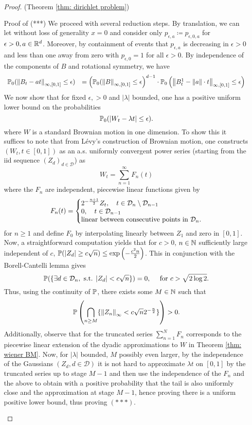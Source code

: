 \documentclass{article}
\begin{document}
\begin{proof}{(Theorem \ref{thm: dirichlet problem})}
\begin{examplesblock}{Proof of (***)}
We proceed with several reduction steps. By translation, we can let without loss of generality $ x=0$ and consider only $ p_{\epsilon,a}\coloneqq p_{\epsilon, 0, a}$ for $ \epsilon>0, a\in \mathbb{R}^{d}$. Moreover, by containment of events that $ p_{\epsilon, a}$ is decreasing in $ \epsilon>0$ and less than one away from zero with $ p_{\epsilon, 0} = 1$ for all $ \epsilon>0$. By independence of the components of $ B$ and rotational symmetry, we have 
\[
\begin{array}{ll}
	\mathbb{P}_{0}(\left\lVert B_{t}-at\right\rVert_{\infty, [0,1]}\leq \epsilon) &= \left(\mathbb{P}_{0}(\left\lVert B\right\rVert_{\infty, [0,1]}\leq \epsilon\right)^{d-1}\cdot \mathbb{P}_{0}\left(\left\lVert B^{1}_{t}-\left\lVert a\right\rVert\cdot t\right\rVert_{\infty, [0,1]}\leq \epsilon\right)\\			      
\end{array}
\]
We now show that for fixed $ \epsilon,  >0$ and $|\lambda|$ bounded, one has a positive uniform lower bound on the probabilities 
\[
\mathbb{P}_{0}(|W_{t}-\lambda t|\leq \epsilon). 
\]
where $ W$ is a standard Brownian motion in one dimension. To show this it suffices to note that from L\'{e}vy's construction of Brownian motion, one constructs $ (W_{t}, t\in [0,1])$ as an a.s. uniformly convergent power series (starting from the iid sequence $ (Z_{d})_{d\in \mathcal{D}}$) as 
\[
W_{t} =\displaystyle\sum^{\infty}_{n=1}F_{n}(t) 
\]
where the $ F_{n}$ are independent, piecewise linear functions given by 
\[
F_{n}(t) = \left\lbrace
\begin{array}{@{}l@{}}
	2^{-\frac{n+1}{2}}Z_{t}, \quad t\in \mathcal{D}_{n}\setminus \mathcal{D}_{n-1} \\
    0, \quad t\in \mathcal{D}_{n-1}\\ 
    \text{linear between consecutive points in } \mathcal{D}_{n}.
\end{array}\right.
\]
for $ n\geq 1$ and define $ F_{0}$ by interpolating linearly between $ Z_{1} $ and zero in $ [0,1]$. Now, a straightforward computation yields that for $c>0 $, $ n\in \mathbb{N}$ sufficiently large independent of $ c$, $\mathbb{P}(|Z_{d}|\geq c\sqrt{n})\leq \exp \left( -\frac{c^{2}n}{2} \right) $. This in conjunction with the Borell-Cantelli lemma gives 
\[
	\mathbb{P}(\{\exists d\in \mathcal{D}_{n}, \text{ s.t. } |Z_{d}|<c\sqrt{n}\}) = 0, \quad \text{ for }c>\sqrt{2\log 2}.
\]
Thus, using the continuity of $ \mathbb{P}$, there exists some $ M\in \mathbb{N}$ such that 
\[
	\mathbb{P} \left( \displaystyle\bigcap_{n\geq M} \{\left\lVert Z_{n}\right\rVert_{\infty}< c\sqrt{n}2^{-\frac{n}{2}}\} \right) > 0.
\]
Additionally, observe that for the truncated series $ \sum_{n=1}^{N} F_{n}$ corresponds to the piecewise linear extension of the dyadic approximations to $ W$ in Theorem \ref{thm: wiener BM}. Now, for $ |\lambda|$ bounded, $ M$ possibly even larger,  by the independence of the Gaussians $ (Z_{d}, d\in \mathcal{D})$ it is not hard to approximate $ \lambda t$ on $ [0,1]$ by the truncated series up to stage $ M-1$ and then use the independence of the $ F_{n}$ and the above to obtain with a positive probability that the tail is also uniformly close and the approximation at stage $ M-1$, hence proving there is a uniform positive lower bound, thus proving $ (***)$. \\ 

\end{examplesblock}
\end{proof}
\end{document}
